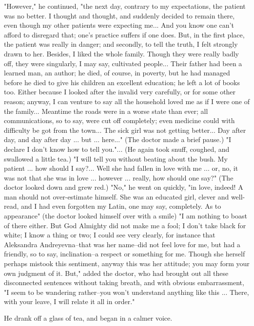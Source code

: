 "However," he continued, "the next day, contrary to my expectations,
the patient was no better. I thought and thought, and suddenly decided
to remain there, even though my other patients were expecting me...
And you know one can't afford to disregard that; one's practice
suffers if one does. But, in the first place, the patient was really
in danger; and secondly, to tell the truth, I felt strongly drawn to
her. Besides, I liked the whole family. Though they were really badly
off, they were singularly, I may say, cultivated people... Their
father had been a learned man, an author; he died, of course, in
poverty, but he had managed before he died to give his children an
excellent education; he left a lot of books too. Either because I
looked after the invalid very carefully, or for some other reason;
anyway, I can venture to say all the household loved me as if I were
one of the family... Meantime the roads were in a worse state than
ever; all communications, so to say, were cut off completely; even
medicine could with difficulty be got from the town... The sick girl
was not getting better... Day after day, and day after day ... but ...
here..." (The doctor made a brief pause.) "I declare I don't know how
to tell you."... (He again took snuff, coughed, and swallowed a little
tea.) "I will tell you without beating about the bush. My patient ...
how should I say?... Well she had fallen in love with me ... or, no,
it was not that she was in love ... however ... really, how should one
say?" (The doctor looked down and grew red.) "No," he went on quickly,
"in love, indeed! A man should not over-estimate himself. She was an
educated girl, clever and well-read, and I had even forgotten my
Latin, one may say, completely. As to appearance" (the doctor looked
himself over with a smile) "I am nothing to boast of there either. But
God Almighty did not make me a fool; I don't take black for white; I
know a thing or two; I could see very clearly, for instance that
Aleksandra Andreyevna--that was her name--did not feel love for me,
but had a friendly, so to say, inclination--a respect or something for
me. Though she herself perhaps mistook this sentiment, anyway this was
her attitude; you may form your own judgment of it. But," added the
doctor, who had brought out all these disconnected sentences without
taking breath, and with obvious embarrassment, "I seem to be wandering
rather--you won't understand anything like this ... There, with your
leave, I will relate it all in order."

He drank off a glass of tea, and began in a calmer voice.

